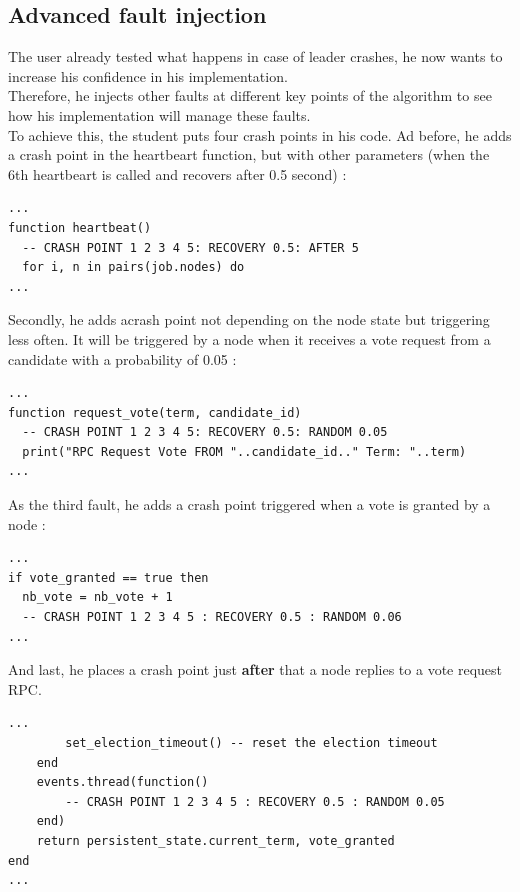 \documentclass{eplmastersthesis}
\begin{document}
      \subsection{Advanced fault injection}

        The user already tested what happens in case of leader crashes, he now
        wants to increase his confidence in his implementation.\\
        Therefore, he injects other faults at different key points of the
        algorithm to see how his implementation will manage these faults.\\

        To achieve this, the student puts four crash points in his code.
        Ad before, he adds a crash point in the heartbeart function, but with
        other parameters (when the 6th heartbeart is called and recovers
        after 0.5 second) :

        \begin{lstlisting}[style=MyLua]
...
function heartbeat()
  -- CRASH POINT 1 2 3 4 5: RECOVERY 0.5: AFTER 5
  for i, n in pairs(job.nodes) do
...
        \end{lstlisting}

        Secondly, he adds acrash point not depending on the
        node state but triggering less often. It will be triggered by a node
        when it receives a vote request from a candidate with a probability
        of 0.05 :

        \begin{lstlisting}[style=MyLua]
...
function request_vote(term, candidate_id)
  -- CRASH POINT 1 2 3 4 5: RECOVERY 0.5: RANDOM 0.05
  print("RPC Request Vote FROM "..candidate_id.." Term: "..term)
...
        \end{lstlisting}

        As the third fault, he adds a crash point triggered when a vote is
        granted by a node :

        \begin{lstlisting}[style=MyLua]
...
if vote_granted == true then
  nb_vote = nb_vote + 1
  -- CRASH POINT 1 2 3 4 5 : RECOVERY 0.5 : RANDOM 0.06
...
        \end{lstlisting}

        And last, he places a crash point just \textbf{after} that a
        node replies to a vote request RPC.

        \begin{lstlisting}[style=MyLua]
...
        set_election_timeout() -- reset the election timeout
    end
    events.thread(function()
        -- CRASH POINT 1 2 3 4 5 : RECOVERY 0.5 : RANDOM 0.05
    end)
    return persistent_state.current_term, vote_granted
end
...
        \end{lstlisting}
\end{document}
